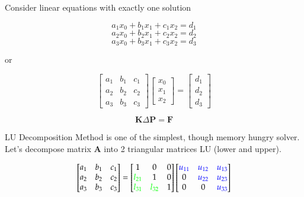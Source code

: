 \bigskip

Consider linear equations with exactly one solution

\begin{equation}
a_1 x_0 + b_1 x_1 + c_1 x_2 = d_1
\end{equation}
\begin{equation}
a_2 x_0 + b_2 x_1 + c_2 x_2 = d_2
\end{equation}
\begin{equation}
a_3 x_0 + b_3 x_1 + c_3 x_2 = d_3
\end{equation}

or

\begin{equation}
\begin{bmatrix}
	a_1 & b_1 & c_1 \\
	a_2 & b_2 & c_2 \\
	a_3 & b_3 & c_3
\end{bmatrix}
\begin{bmatrix}
	x_0 \\
	x_1 \\
	x_2
\end{bmatrix}
=
\begin{bmatrix}
	d_1 \\
	d_2 \\
	d_3
\end{bmatrix}
\end{equation}

\begin{equation}
\mathbf{K} \Delta \mathbf{P} = \mathbf{F}
\end{equation}

LU Decomposition Method is one of the simplest, though memory hungry solver. Let's decompose matrix $\mathbf{A}$ into 2 triangular matrices LU (lower and upper).

\begin{equation}
\begin{bmatrix}
	a_1 & b_1 & c_1 \\
	a_2 & b_2 & c_2 \\
	a_3 & b_3 & c_3
\end{bmatrix}
=
\begin{bmatrix}
	1 & 0 & 0 \\
	\color{green}{l_{21}} & 1 & 0 \\
	\color{green}{l_{31}} & \color{green}{l_{32}} & 1
\end{bmatrix}
\begin{bmatrix}
	\color{blue}{u_{11}} & \color{blue}{u_{12}} & \color{blue}{u_{13}} \\
	0 & \color{blue}{u_{22}} & \color{blue}{u_{23}} \\
	0 & 0 & \color{blue}{u_{33}}
\end{bmatrix}
\end{equation}

